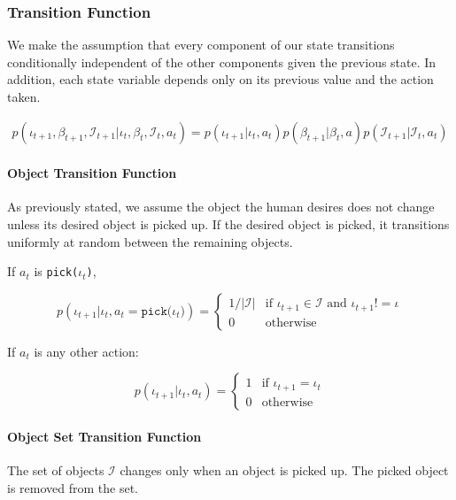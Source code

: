 \documentclass{article}
\newcommand{\Iota}{\mathcal{I}}
\begin{document}
\subsubsection{Transition Function} \label{sssec:tf}

We make the assumption that every component of our state transitions conditionally independent of the other components given the previous state. In addition, each state variable depends only on its previous value and the action taken. 

\begin{align*}
	p(\iota_{t+1}, \beta_{t+1}, \Iota_{t+1} | \iota_t, \beta_t, \Iota_t, a_t)  =  p(\iota_{t+1} | \iota_t, a_t) p(\beta_{t+1} | \beta_t, a) p(\Iota_{t+1} | \Iota_t, a_t)
\end{align*}

\paragraph{Object Transition Function}
As previously stated, we assume the object the human desires does not change unless its desired object is picked up. If the desired object is picked, it transitions uniformly at random between the remaining objects. 

If $a_t$ is \texttt{pick($\iota_t$)}, 

\begin{equation}
	p(\iota_{t+1} | \iota_t, a_t = \texttt{pick($\iota_t$)}) = \begin{cases}
		1/|\Iota| & \text{if } \iota_{t+1} \in \Iota \text{ and } \iota_{t+1} != \iota \\
		0 & \text{otherwise} 
	\end{cases}
\end{equation}


If $a_t$ is any other action: 

\begin{equation}
	p(\iota_{t+1} | \iota_t, a_t) = \begin{cases} 
		1 & \text{if $\iota_{t+1} = \iota_t$} \\
		0 & \text{otherwise}
	\end{cases}
\end{equation}

\paragraph{Object Set Transition Function}

The set of objects $\Iota$ changes only when an object is picked up. The picked object is removed from the set. 
\end{document}
